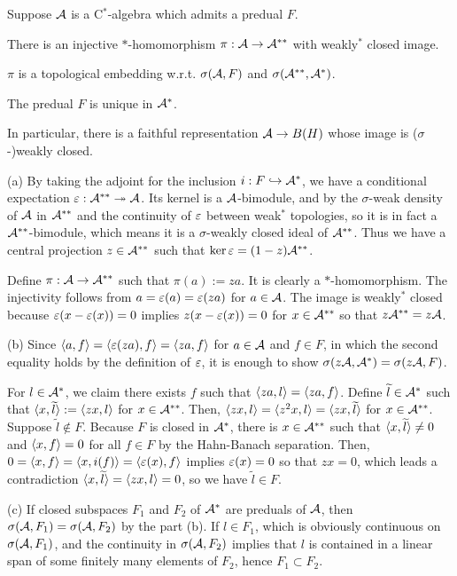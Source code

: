 \documentclass{../../small}
\begin{document}
\begin{thm}[Sakai]
Suppose $\mathcal{A}$ is a C$^*$-algebra which admits a predual $F$.
\begin{parts}
\item There is an injective $*$-homomorphism $\pi:\mathcal{A}\to\mathcal{A}^{**}$ with weakly$^*$ closed image.
\item $\pi$ is a topological embedding w.r.t. $\sigma(\mathcal{A},F)$ and $\sigma(\mathcal{A}^{**},\mathcal{A}^*)$.
\item The predual $F$ is unique in $\mathcal{A}^*$.
\end{parts}
In particular, there is a faithful representation $\mathcal{A}\to B(H)$ whose image is ($\sigma$-)weakly closed.
\end{thm}
\begin{pf}
(a)
By taking the adjoint for the inclusion $i:F\hookrightarrow\mathcal{A}^*$, we have a conditional expectation $\varepsilon:\mathcal{A}^{**}\twoheadrightarrow\mathcal{A}$.
Its kernel is a $\mathcal{A}$-bimodule, and by the $\sigma$-weak density of $\mathcal{A}$ in $\mathcal{A}^{**}$ and the continuity of $\varepsilon$ between weak$^*$ topologies, so it is in fact a $\mathcal{A}^{**}$-bimodule, which means it is a $\sigma$-weakly closed ideal of $\mathcal{A}^{**}$.
Thus we have a central projection $z\in\mathcal{A}^{**}$ such that $\ker\varepsilon=(1-z)\mathcal{A}^{**}$.

Define $\pi:\mathcal{A}\to\mathcal{A}^{**}$ such that $\pi(a):=za$.
It is clearly a $*$-homomorphism.
The injectivity follows from $a=\varepsilon(a)=\varepsilon(za)$ for $a\in\mathcal{A}$.
The image is weakly$^*$ closed because $\varepsilon(x-\varepsilon(x))=0$ implies $z(x-\varepsilon(x))=0$ for $x\in\mathcal{A}^{**}$ so that $z\mathcal{A}^{**}=z\mathcal{A}$.

(b)
Since $\langle a,f\rangle=\langle\varepsilon(za),f\rangle=\langle za,f\rangle$ for $a\in\mathcal{A}$ and $f\in F$, in which the second equality holds by the definition of $\varepsilon$, it is enough to show $\sigma(z\mathcal{A},\mathcal{A}^*)=\sigma(z\mathcal{A},F)$.

For $l\in\mathcal{A}^*$, we claim there exists $f$ such that $\langle za,l\rangle=\langle za,f\rangle$.
Define $\widetilde l\in\mathcal{A}^*$ such that $\langle x,\widetilde l\rangle:=\langle zx,l\rangle$ for $x\in\mathcal{A}^{**}$.
Then, $\langle zx,l\rangle=\langle z^2x,l\rangle=\langle zx,\widetilde l\rangle$ for $x\in\mathcal{A}^{**}$.
Suppose $\tilde l\notin F$.
Because $F$ is closed in $\mathcal{A}^*$, there is $x\in\mathcal{A}^{**}$ such that $\langle x,\widetilde l\rangle\ne0$ and $\langle x,f\rangle=0$ for all $f\in F$ by the Hahn-Banach separation.
Then, $0=\langle x,f\rangle=\langle x,i(f)\rangle=\langle\varepsilon(x),f\rangle$ implies $\varepsilon(x)=0$ so that $zx=0$, which leads a contradiction $\langle x,\widetilde l\rangle=\langle zx,l\rangle=0$, so we have $\tilde l\in F$.

(c)
If closed subspaces $F_1$ and $F_2$ of $\mathcal{A}^*$ are preduals of $\mathcal{A}$, then $\sigma(\mathcal{A},F_1)=\sigma(\mathcal{A},F_2)$ by the part (b).
If $l\in F_1$, which is obviously continuous on $\sigma(\mathcal{A},F_1)$, and the continuity in $\sigma(\mathcal{A},F_2)$ implies that $l$ is contained in a linear span of some finitely many elements of $F_2$, hence $F_1\subset F_2$.
\end{pf}
\end{document}
